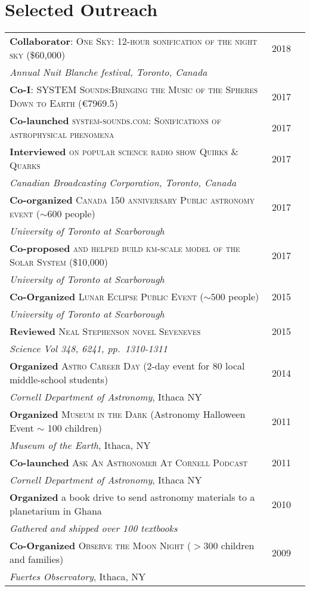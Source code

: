 \documentclass[10pt]{article} %
\begin{document}

\section{Selected Outreach}

\begin{tabular}{l>{\hfill}p{1.1cm}r}
{\bf Collaborator}: \textsc{One Sky: 12-hour sonification of the night sky}  \footnotesize(\$60,000)\normalsize & 2018 \\
{\it Annual Nuit Blanche festival, Toronto, Canada} \\
{\bf Co-I}: \textsc{SYSTEM Sounds:Bringing the Music of the Spheres Down to Earth} \footnotesize(\euro7969.5)\normalsize & 2017 \\
{\bf Co-launched} \textsc{system-sounds.com: Sonifications of  astrophysical phenomena} & 2017 \\
{\bf Interviewed} \textsc{on popular science radio show Quirks \& Quarks} & 2017 \\
{\it Canadian Broadcasting Corporation, Toronto, Canada} \\
{\bf Co-organized} \textsc{Canada 150 anniversary Public astronomy event} ($\sim 600$ people) & 2017 \\
{\it University of Toronto at Scarborough} \\
{\bf Co-proposed} \textsc{and helped build km-scale model of the Solar System} \footnotesize(\$10,000)\normalsize & 2017 \\
{\it University of Toronto at Scarborough} \\
{\bf Co-Organized} \textsc{Lunar Eclipse Public Event} ($\sim 500$ people) & 2015\\
{\it University of Toronto at Scarborough} \\
{\bf Reviewed} \textsc{Neal Stephenson novel Seveneves} & 2015\\
{\it Science Vol 348, 6241, pp.~1310-1311} \\
{\bf Organized} \textsc{Astro Career Day} (2-day event for 80 local middle-school students) & 2014\\
{\it Cornell Department of Astronomy}, Ithaca NY \\
{\bf Organized} \textsc{Museum in the Dark} (Astronomy Halloween Event $\sim$ 100 children) & 2011\\
{\it Museum of the Earth}, Ithaca, NY \\
{\bf Co-launched} \textsc{Ask An Astronomer At Cornell Podcast} & 2011\\
{\it Cornell Department of Astronomy}, Ithaca NY  \\
{\bf Organized} a book drive to send astronomy materials to a planetarium in Ghana & 2010\\
{\it Gathered and shipped over 100 textbooks} \\
{\bf Co-Organized} \textsc{Observe the Moon Night} ($> 300$ children and families) & 2009\\
{\it Fuertes Observatory}, Ithaca, NY \\
\end{tabular}
\end{document}
